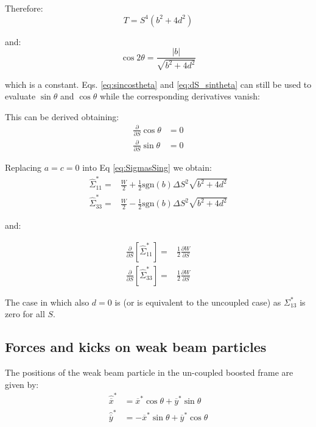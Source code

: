Therefore:
\begin{equation}
T = S^4\left( b^2 + 4 d^2\right)
\end{equation}

and:
\begin{equation}
\cos 2 \theta = \frac{\left|b\right|}{\sqrt{b^2+4d^2}}
\end{equation}

which is a constant. Eqs. \ref{eq:sincostheta} and \ref{eq:dS_sintheta} can still be used to evaluate $\sin \theta$ and $\cos \theta$ while the corresponding derivatives vanish:

This can be derived obtaining:
\begin{align}
\frac{\partial }{\partial S} \cos \theta &= 0\\
\frac{\partial }{\partial S} \sin \theta &= 0
\end{align}

Replacing $a=c=0$ into Eq \ref{eq:SigmasSing} we obtain:
\begin{align}
\hat{\Sigma}^*_{11}  =& \frac{W}{2}
+\frac{1}{2}\mathrm{sgn}(b)\Delta S^2\sqrt{b^2+4d^2} \\
\hat{\Sigma}^*_{33} =& \frac{W}{2}
-\frac{1}{2}\mathrm{sgn}(b)\Delta S^2\sqrt{b^2+4d^2}
\end{align}

and:

\begin{align}
\frac{\partial }{\partial S} \left[\hat{\Sigma}^*_{11} \right] =& \frac{1}{2}\frac{\partial W }{\partial S}\\
\frac{\partial }{\partial S} \left[\hat{\Sigma}^*_{33} \right] =& \frac{1}{2}\frac{\partial W }{\partial S}
\end{align}

The case in which also $d=0$ is (or is equivalent to the uncoupled case) as $\Sigma^*_{13}$ is zero for all $S$.




\subsection{Forces and kicks on weak beam particles}

The positions of the weak beam particle in the un-coupled boosted frame are given by:
\begin{align}
\hat{\overline{x}}^* &= \overline{x}^*\cos \theta  + \overline{y}^*\sin \theta \\
\hat{\overline{y}}^* &= -\overline{x}^*\sin \theta  + \overline{y}^* \cos \theta
\end{align}

